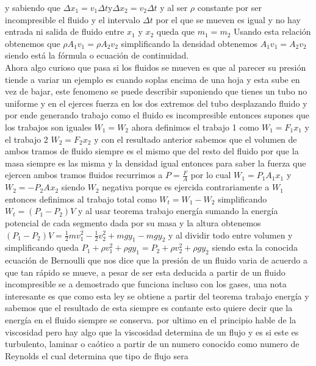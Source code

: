 \documentclass{article}
\begin{document}
y sabiendo que $\Delta {x}_{1} =  {v}_{1}\Delta t$y$\Delta {x}_{2} =  {v}_{2}\Delta t$
y al ser $\rho$ constante por ser incompresible el fluido y el intervalo $\Delta t$ por el que se mueven es igual y no hay entrada ni salida
de fluido entre ${x}_{1}$ y ${x}_{2}$ queda que ${m}_{1}={m}_{2}$
Usando esta relación obtenemos que
$\rho {A}_{1}{v}_{1}=\rho{A}_{2}{v}_{2}$ simplificando la densidad
obtenemos ${A}_{1}{v}_{1}={A}_{2}{v}_{2}$
siendo está la fórmula o ecuación de continuidad.\\
Ahora algo curioso que pasa si los fluidos se mueven es que al parecer su presión tiende a variar
un ejemplo es cuando soplas encima de una hoja y esta sube en vez de bajar,
este fenomeno se puede describir suponiendo que tienes un tubo no uniforme y en el
ejerces fuerza en los dos extremos del tubo desplazando fluido y por ende generando trabajo
como el fluido es incompresible entonces supones que los trabajos son iguales ${W}_{1}={W}_{2}$
ahora definimos el trabajo 1 como ${W}_{1}={F}_{1}{x}_{1}$ y el trabajo 2
${W}_{2}={F}_{2}{x}_{2}$ y con el resultado anterior sabemos que el volumen de ambos tramos
de fluido siempre es el mismo que del resto del fluido por que la masa siempre es las misma y la densidad igual
entonces para saber la fuerza que ejercen ambos tramos fluidos recurrimos a $P=\frac{F}{A}$
por lo cual ${W}_{1}={P}_{1}{A}_{1}{x}_{1}$ y ${W}_{2}=-{P}_{2}{A}_{}{x}_{2}$ siendo ${W}_{2}$ negativa porque 
es ejercida contrariamente a ${W}_{1}$ entonces definimos al trabajo total como
${W}_{t}={W}_{1}-{W}_{2}$
simplificando ${W}_{t}=({P}_{1}-{P}_{2})V$
y al usar teorema trabajo energía sumando la energía potencial de cada segmento dada
por su masa y la altura obtenemos
$({P}_{1}-{P}_{2})V=\frac{1}{2}m{v}_{1}^{2}-\frac{1}{2}{v}_{2}^{2}+mg{y}_{1}-mg{y}_{2}$ y al dividir todo entre volumen y simplificando queda
${P}_{1}+\rho {v}_{1}^{2}+\rho g{y}_{1}={P}_{2}+\rho {v}_{2}^{2}+\rho g{y}_{2}$
siendo esta la conocida ecuación de Bernoulli que nos dice que la presión de un fluido
varia de acuerdo a que tan rápido se mueve, a pesar de ser esta deducida a partir de un fluido
incompresible se a demostrado que funciona incluso con los gases, una nota interesante
es que como esta ley se obtiene a partir del teorema trabajo energía y sabemos que
el resultado de esta siempre es contante esto quiere decir que la energía en el fluido siempre
se conserva.
por ultimo en el principio hable de la viscosidad pero hay algo que la viscosidad 
determina de un flujo y es si este es turbulento, laminar o caótico a partir de un 
numero conocido como numero de Reynolds el cual determina que tipo de flujo sera
\end{document}
